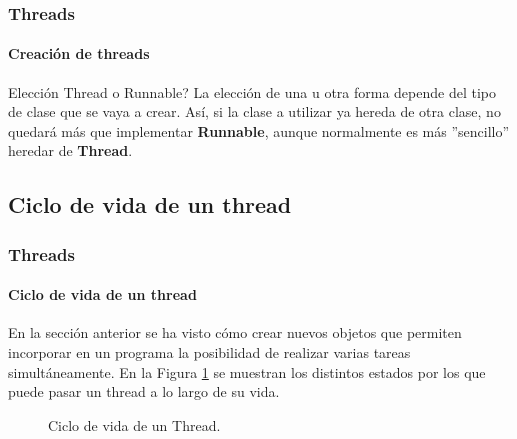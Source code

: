 \documentclass{beamer}
\begin{document}
	\begin{frame}
		\frametitle{Threads}
		\framesubtitle{Creaci\'on de threads}

        \begin{alertblock}{Elecci\'on \textquestiondown Thread o Runnable?}
            La elecci\'on de una u otra forma depende del tipo de clase que se vaya a crear. As\'i, si la clase a utilizar ya hereda de otra clase, no quedar\'a m\'as que implementar \textbf{Runnable}, aunque normalmente es m\'as ''sencillo'' heredar de \textbf{Thread}.
        \end{alertblock}
	\end{frame}	

    \subsection{Ciclo de vida de un thread}

	\begin{frame}
		\frametitle{Threads}
		\framesubtitle{Ciclo de vida de un thread}

        En la secci\'on anterior se ha visto c\'omo crear nuevos objetos que permiten incorporar en un programa la posibilidad de realizar varias tareas simult\'aneamente. En la Figura \ref{fig-ciclo} se muestran los distintos estados por los que puede pasar un thread a lo largo de su vida. 
        \begin{center}
            \begin{figure}
                \caption{Ciclo de vida de un Thread.}\label{fig-ciclo}
            \end{figure}
	    \end{center}
	\end{frame}	
\end{document}
